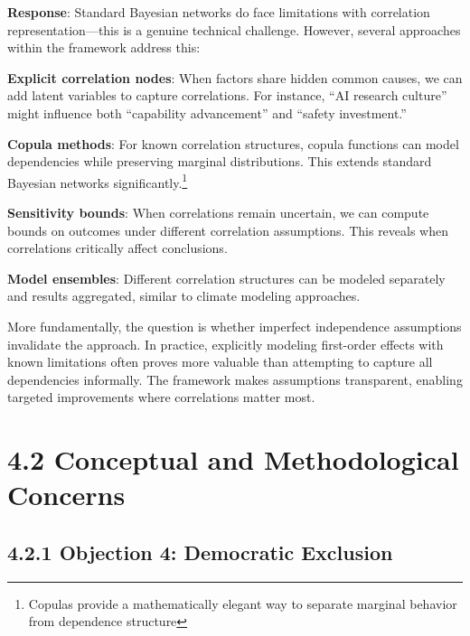 \documentclass[
  11pt,
  letterpaper,
]{book}
\begin{document}
\textbf{Response}: Standard Bayesian networks do face limitations with
correlation representation---this is a genuine technical challenge.
However, several approaches within the framework address this:

\textbf{Explicit correlation nodes}: When factors share hidden common
causes, we can add latent variables to capture correlations. For
instance, ``AI research culture'' might influence both ``capability
advancement'' and ``safety investment.''

\textbf{Copula methods}: For known correlation structures, copula
functions can model dependencies while preserving marginal
distributions. This extends standard Bayesian networks
significantly.\footnote{Copulas provide a mathematically elegant way to
  separate marginal behavior from dependence structure}

\textcite{nelson2006}

\textbf{Sensitivity bounds}: When correlations remain uncertain, we can
compute bounds on outcomes under different correlation assumptions. This
reveals when correlations critically affect conclusions.

\textbf{Model ensembles}: Different correlation structures can be
modeled separately and results aggregated, similar to climate modeling
approaches.

More fundamentally, the question is whether imperfect independence
assumptions invalidate the approach. In practice, explicitly modeling
first-order effects with known limitations often proves more valuable
than attempting to capture all dependencies informally. The framework
makes assumptions transparent, enabling targeted improvements where
correlations matter most.

\section*{4.2 Conceptual and Methodological
Concerns}\label{sec-conceptual-concerns}


\subsection*{4.2.1 Objection 4: Democratic
Exclusion}\label{sec-democratic-exclusion}
\end{document}
